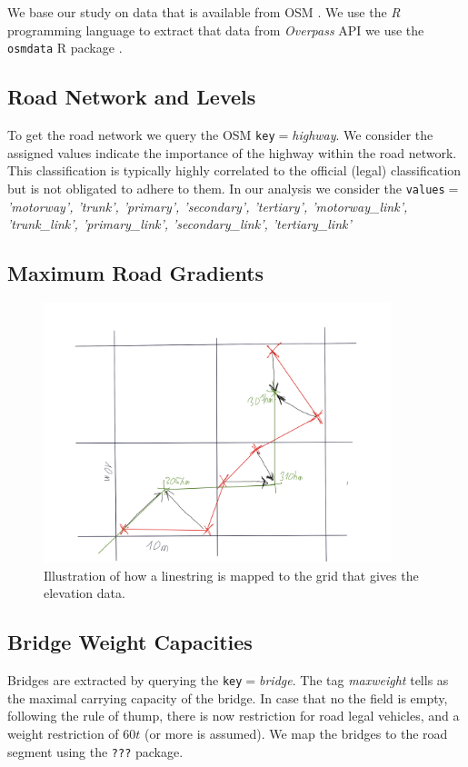 %

We base our study on data that is available from OSM \cite{OpenStreetMap}.
We use the \emph{R} programming language \cite{RVienna} to extract that data from
\emph{Overpass} API we use the \texttt{osmdata} R package \cite{osmdataR20221}.


\subsection{Road Network and Levels}
To get the road network we query the OSM \texttt{key}$=$\textit{highway}. We consider the
assigned values indicate the importance of the highway within the road network.
This classification is typically highly correlated to the official (legal) classification
but is not obligated to adhere to them. In our analysis we consider the
\texttt{values}$=$
\textit{'motorway', 'trunk', 'primary', 'secondary', 'tertiary', 'motorway\_link', 'trunk\_link', 'primary\_link', 'secondary\_link', 'tertiary\_link'}

\subsection{Maximum Road Gradients}

\begin{figure}[!ht]
  \includegraphics[width=0.9\textwidth]{./figures/mapping.png}
  \caption{Illustration of how a linestring is mapped to the grid that gives the elevation data.}
  \label{fig:mapelev}
\end{figure}


\subsection{Bridge Weight Capacities}
Bridges are extracted by querying the \texttt{key}$=$\textit{bridge}. The tag \textit{maxweight}
tells as the maximal carrying capacity of the bridge. In case that no the field is empty,
following the rule of thump, there is now restriction for road legal vehicles, and
a weight restriction of $60t$ (or more is assumed).
We map the bridges to the road segment using the \texttt{???} package.
